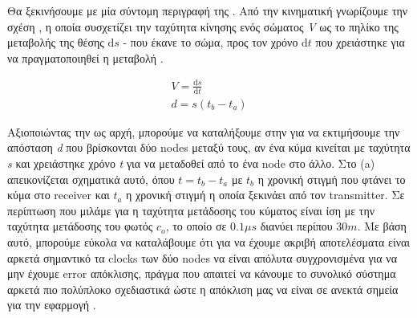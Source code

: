 Θα ξεκινήσουμε με μία σύντομη περιγραφή της . Από την κινηματική γνωρίζουμε την 
σχέση , η οποία συσχετίζει την ταχύτητα κίνησης ενός σώματος \emph{V} ως το πηλίκο της μεταβολής
της θέσης $\mathrm{d}s$ - που έκανε το σώμα, προς τον χρόνο $\mathrm{d}t$ που χρειάστηκε για να πραγματοποιηθεί η μεταβολή \cite{Kinematics}.

\begin{gather}
	V=\frac{\mathrm{d}s}{\mathrm{d}t} \label{eq:speed} \\
	d=s(t_b-t_a) \label{eq:tod-distance}
\end{gather}

Αξιοποιώντας την  ως αρχή, μπορούμε να καταλήξουμε στην  για να εκτιμήσουμε
την απόσταση \emph{d} που βρίσκονται δύο nodes μεταξύ τους, αν ένα κύμα κινείται με ταχύτητα \emph{s} και χρειάστηκε 
χρόνο \emph{t} για να μεταδοθεί από το ένα node στο άλλο. Στο  (a) απεικονίζεται
σχηματικά αυτό, όπου $t=t_b-t_a$ με $t_b$ η χρονική στιγμή που φτάνει το κύμα στο receiver και $t_a$
η χρονική στιγμή η οποία ξεκινάει από τον transmitter. Σε περίπτωση που μιλάμε για  
 η ταχύτητα μετάδοσης του κύματος είναι ίση με την ταχύτητα μετάδοσης του φωτός $c_o$, το οποίο 
σε $0.1μs$ διανύει περίπου $30m$.   
Με βάση αυτό, μπορούμε εύκολα να καταλάβουμε ότι για να έχουμε ακριβή αποτελέσματα είναι αρκετά σημαντικό
τα clocks των δύο nodes να είναι απόλυτα συγχρονισμένα για να μην έχουμε error απόκλισης, πράγμα που
απαιτεί να κάνουμε το συνολικό σύστημα αρκετά πιο πολύπλοκο σχεδιαστικά 
ώστε η απόκλιση μας να είναι σε ανεκτά σημεία για την εφαρμογή \cite{wsn-Localization-systems} \cite{wsn-Localization-techniques}.

